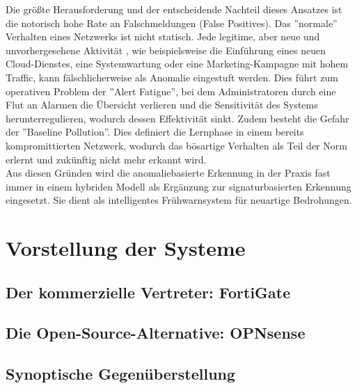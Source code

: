 Die größte Herausforderung und der entscheidende Nachteil dieses Ansatzes ist die notorisch hohe Rate an Falschmeldungen (False Positives). Das ''normale'' Verhalten eines Netzwerks ist nicht statisch. Jede legitime, aber neue und unvorhergesehene Aktivität , wie beispielsweise die Einführung eines neuen Cloud-Dienstes, eine Systemwartung oder eine Marketing-Kampagne mit hohem Traffic, kann fälschlicherweise als Anomalie eingestuft werden. Dies führt zum operativen Problem der ''Alert Fatigue'', bei dem Administratoren durch eine Flut an Alarmen die Übersicht verlieren und die Sensitivität des Systems herunterregulieren, wodurch dessen Effektivität sinkt. Zudem besteht die Gefahr der ''Baseline Pollution''. Dies definiert die Lernphase in einem bereits kompromittierten Netzwerk, wodurch das bösartige Verhalten als Teil der Norm erlernt und zukünftig nicht mehr erkannt wird.\\

Aus diesen Gründen wird die anomaliebasierte Erkennung in der Praxis fast immer in einem hybriden Modell als Ergänzung zur signaturbasierten Erkennung eingesetzt. Sie dient als intelligentes Frühwarnsystem für neuartige Bedrohungen.
\section{Vorstellung der Systeme}
\subsection{Der kommerzielle Vertreter: FortiGate}
\subsection{Die Open-Source-Alternative: OPNsense}
\subsection{Synoptische Gegenüberstellung}